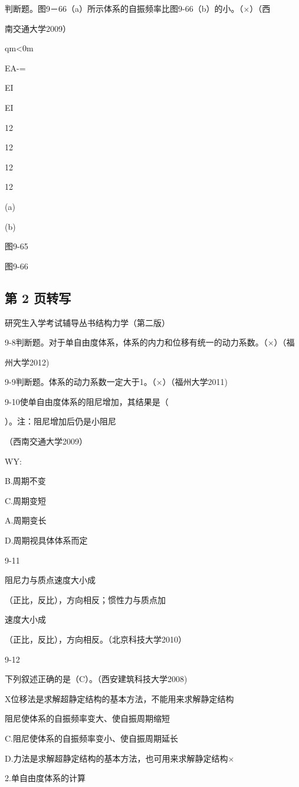 判断题。图9－66（a）所示体系的自振频率比图9-66（b）的小。（$\times$）（西

南交通大学2009）

qm<0m

EA-=

EI

EI

12

12

12

12

(a)

(b)

图9-65

图9-66

\subsection*{第 2 页转写}
研究生入学考试辅导丛书结构力学（第二版）

9-8判断题。对于单自由度体系，体系的内力和位移有统一的动力系数。（$\times$）（福

州大学2012)

9-9判断题。体系的动力系数一定大于1。（$\times$）（福州大学2011)

9-10使单自由度体系的阻尼增加，其结果是（

）。注：阻尼增加后仍是小阻尼

（西南交通大学2009）

WY:

B.周期不变

C.周期变短

A.周期变长

D.周期视具体体系而定

9-11

阻尼力与质点速度大小成

（正比，反比），方向相反；惯性力与质点加

速度大小成

（正比，反比），方向相反。（北京科技大学2010）

9-12

下列叙述正确的是（C）。（西安建筑科技大学2008)

X位移法是求解超静定结构的基本方法，不能用来求解静定结构

阻尼使体系的自振频率变大、使自振周期缩短

C.阻尼使体系的自振频率变小、使自振周期延长

D.力法是求解超静定结构的基本方法，也可用来求解静定结构$\times$

2.单自由度体系的计算

